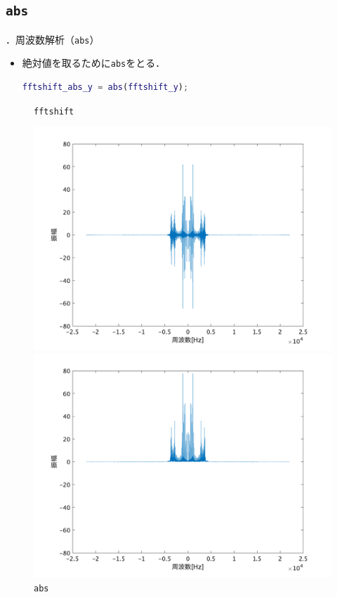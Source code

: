 \documentclass[aspectratio=43]{beamer}
\newcommand{\showsec}{\thesection ．}
\begin{document}
\subsection{\texttt{abs}}
\begin{frame}[t,containsverbatim]{\showsec 周波数解析（\texttt{abs}）}
    \begin{itemize}
        \item 絶対値を取るために\texttt{abs}をとる．\\
              \begin{lstlisting}[language={Matlab},frame={lines},numbers={none},xleftmargin={0mm}]
fftshift_abs_y = abs(fftshift_y);
                        \end{lstlisting}
    \end{itemize}
    \begin{figure}
        \centering
        \begin{minipage}{.49\textwidth}
            \centering
            \caption{\texttt{fftshift}}
            \includegraphics[keepaspectratio,width=\textwidth]{fft_fftshift.png}
        \end{minipage}
        \begin{minipage}{.49\textwidth}
            \centering
            \caption{\texttt{abs}}
            \includegraphics[keepaspectratio,width=\textwidth]{fft_abs.png}

\end{minipage}
\end{figure}
\end{frame}
\end{document}

